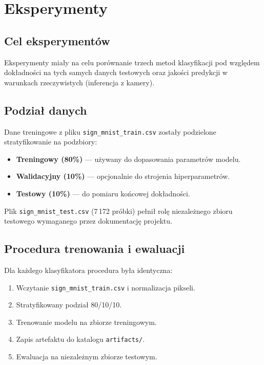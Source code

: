 \chapter{Eksperymenty}
\label{cha:chapter003}

\section{Cel eksperymentów}

Eksperymenty miały na celu porównanie trzech metod klasyfikacji pod względem
dokładności na tych samych danych testowych oraz jakości predykcji w warunkach
rzeczywistych (inferencja z kamery).

\section{Podział danych}

Dane treningowe z pliku \texttt{sign\_mnist\_train.csv} zostały podzielone
stratyfikowanie na podzbiory:

\begin{itemize}
    \item \textbf{Treningowy (80\%)} --- używany do dopasowania parametrów modelu.
    \item \textbf{Walidacyjny (10\%)} --- opcjonalnie do strojenia hiperparametrów.
    \item \textbf{Testowy (10\%)} --- do pomiaru końcowej dokładności.
\end{itemize}

Plik \texttt{sign\_mnist\_test.csv} (7\,172 próbki) pełnił rolę niezależnego
zbioru testowego wymaganego przez dokumentację projektu.

\section{Procedura trenowania i ewaluacji}

Dla każdego klasyfikatora procedura była identyczna:

\begin{enumerate}
    \item Wczytanie \texttt{sign\_mnist\_train.csv} i normalizacja pikseli.
    \item Stratyfikowany podział 80/10/10.
    \item Trenowanie modelu na zbiorze treningowym.
    \item Zapis artefaktu do katalogu \texttt{artifacts/}.
    \item Ewaluacja na niezależnym zbiorze testowym.
\end{enumerate}

